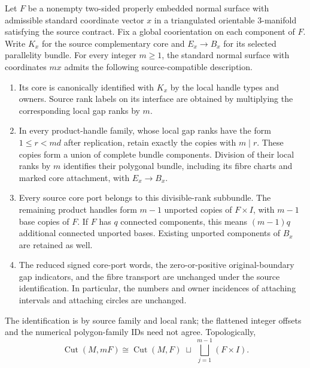\begin{theorem}
\label{int:replication-theorem}
Let $F$ be a nonempty two-sided properly embedded normal surface with
admissible standard coordinate vector $x$ in a triangulated orientable
$3$-manifold satisfying the source contract.  Fix a global coorientation
on each component of $F$.  Write $K_x$ for the source complementary core
and $E_x\to B_x$ for its selected parallelity bundle.  For every integer
$m\ge1$, the standard normal surface with coordinates $mx$ admits the
following source-compatible description.
\begin{enumerate}
\item Its core is canonically identified with $K_x$ by the local handle
types and owners.  Source rank labels on its interface are obtained by
multiplying the corresponding local gap ranks by $m$.
\item In every product-handle family, whose local gap ranks have the form
$1\le r<md$ after replication, retain exactly the copies with $m\mid r$.
These copies form a union of complete bundle components.  Division of
their local ranks by $m$ identifies their polygonal bundle, including its
fibre charts and marked core attachment, with $E_x\to B_x$.
\item Every source core port belongs to this divisible-rank subbundle.
The remaining product handles form $m-1$ unported copies of $F\times I$,
with $m-1$ base copies of $F$.  If $F$ has $q$ connected components, this
means $(m-1)q$ additional connected unported bases.  Existing unported
components of $B_x$ are retained as well.
\item The reduced signed core-port words, the zero-or-positive
original-boundary gap indicators, and the fibre transport are unchanged
under the source identification.  In particular, the numbers and owner
incidences of attaching intervals and attaching circles are unchanged.
\end{enumerate}
The identification is by source family and local rank; the flattened
integer offsets and the numerical polygon-family IDs need not agree.
Topologically,
\[
 \operatorname{Cut}(M,mF)\cong
 \operatorname{Cut}(M,F)\;\sqcup\;
 \bigsqcup_{j=1}^{m-1}(F\times I).
\]
\end{theorem}

